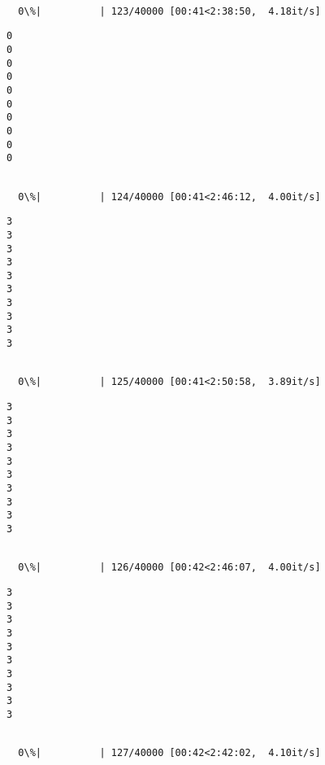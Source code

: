 \documentclass[11pt]{article}
\begin{document}
    \begin{Verbatim}[commandchars=\\\{\}]

  0\%|          | 123/40000 [00:41<2:38:50,  4.18it/s]
    \end{Verbatim}

    \begin{Verbatim}[commandchars=\\\{\}]
0
0
0
0
0
0
0
0
0
0

    \end{Verbatim}

    \begin{Verbatim}[commandchars=\\\{\}]

  0\%|          | 124/40000 [00:41<2:46:12,  4.00it/s]
    \end{Verbatim}

    \begin{Verbatim}[commandchars=\\\{\}]
3
3
3
3
3
3
3
3
3
3

    \end{Verbatim}

    \begin{Verbatim}[commandchars=\\\{\}]

  0\%|          | 125/40000 [00:41<2:50:58,  3.89it/s]
    \end{Verbatim}

    \begin{Verbatim}[commandchars=\\\{\}]
3
3
3
3
3
3
3
3
3
3

    \end{Verbatim}

    \begin{Verbatim}[commandchars=\\\{\}]

  0\%|          | 126/40000 [00:42<2:46:07,  4.00it/s]
    \end{Verbatim}

    \begin{Verbatim}[commandchars=\\\{\}]
3
3
3
3
3
3
3
3
3
3

    \end{Verbatim}

    \begin{Verbatim}[commandchars=\\\{\}]

  0\%|          | 127/40000 [00:42<2:42:02,  4.10it/s]
    \end{Verbatim}
\end{document}
